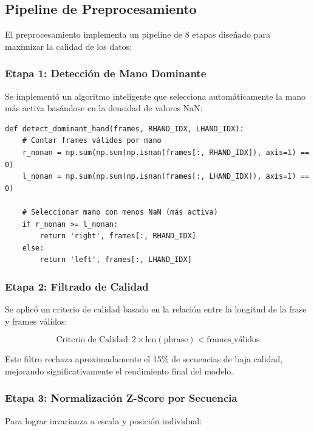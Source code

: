 \documentclass[12pt,a4paper]{article}
\begin{document}
\subsection{Pipeline de Preprocesamiento}

El preprocesamiento implementa un pipeline de 8 etapas diseñado para maximizar la calidad de los datos:

\subsubsection{Etapa 1: Detección de Mano Dominante}

Se implementó un algoritmo inteligente que selecciona automáticamente la mano más activa basándose en la densidad de valores NaN:

\begin{lstlisting}[style=python, caption=Detección de mano dominante]
def detect_dominant_hand(frames, RHAND_IDX, LHAND_IDX):
    # Contar frames válidos por mano
    r_nonan = np.sum(np.sum(np.isnan(frames[:, RHAND_IDX]), axis=1) == 0)
    l_nonan = np.sum(np.sum(np.isnan(frames[:, LHAND_IDX]), axis=1) == 0)
    
    # Seleccionar mano con menos NaN (más activa)
    if r_nonan >= l_nonan:
        return 'right', frames[:, RHAND_IDX]
    else:
        return 'left', frames[:, LHAND_IDX]
\end{lstlisting}

\subsubsection{Etapa 2: Filtrado de Calidad}

Se aplicó un criterio de calidad basado en la relación entre la longitud de la frase y frames válidos:

\begin{equation}
\text{Criterio de Calidad}: 2 \times \text{len}(\text{phrase}) < \text{frames\_válidos}
\end{equation}

Este filtro rechaza aproximadamente el 15\% de secuencias de baja calidad, mejorando significativamente el rendimiento final del modelo.

\subsubsection{Etapa 3: Normalización Z-Score por Secuencia}

Para lograr invarianza a escala y posición individual:
\end{document}
